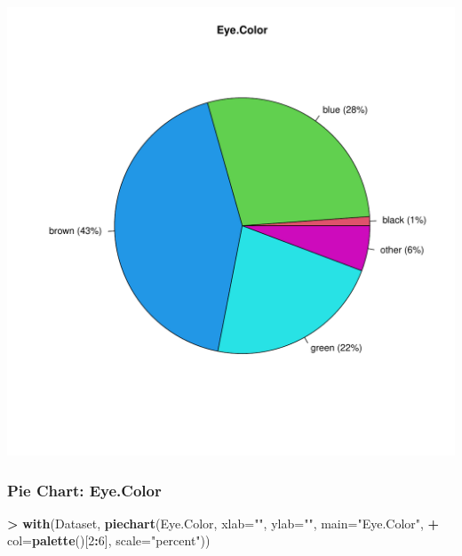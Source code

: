 \documentclass[
]{article}
\newenvironment{Shaded}{\begin{snugshade}}{\end{snugshade}}
\newcommand{\AttributeTok}[1]{\textcolor[rgb]{0.13,0.29,0.53}{#1}}
\newcommand{\DecValTok}[1]{\textcolor[rgb]{0.00,0.00,0.81}{#1}}
\newcommand{\FunctionTok}[1]{\textcolor[rgb]{0.13,0.29,0.53}{\textbf{#1}}}
\newcommand{\NormalTok}[1]{#1}
\newcommand{\SpecialCharTok}[1]{\textcolor[rgb]{0.81,0.36,0.00}{\textbf{#1}}}
\newcommand{\StringTok}[1]{\textcolor[rgb]{0.31,0.60,0.02}{#1}}
\begin{document}
\includegraphics[width=750px]{RcmdrMarkdown_files/figure-latex/unnamed-chunk-21-1}

\subsubsection{Pie Chart: Eye.Color}\label{pie-chart-eye.color-2}

\begin{Shaded}
\begin{Highlighting}[]
\SpecialCharTok{\textgreater{}} \FunctionTok{with}\NormalTok{(Dataset, }\FunctionTok{piechart}\NormalTok{(Eye.Color, }\AttributeTok{xlab=}\StringTok{""}\NormalTok{, }\AttributeTok{ylab=}\StringTok{""}\NormalTok{, }\AttributeTok{main=}\StringTok{"Eye.Color"}\NormalTok{, }
\SpecialCharTok{+}   \AttributeTok{col=}\FunctionTok{palette}\NormalTok{()[}\DecValTok{2}\SpecialCharTok{:}\DecValTok{6}\NormalTok{], }\AttributeTok{scale=}\StringTok{"percent"}\NormalTok{))}
\end{Highlighting}
\end{Shaded}
\end{document}
